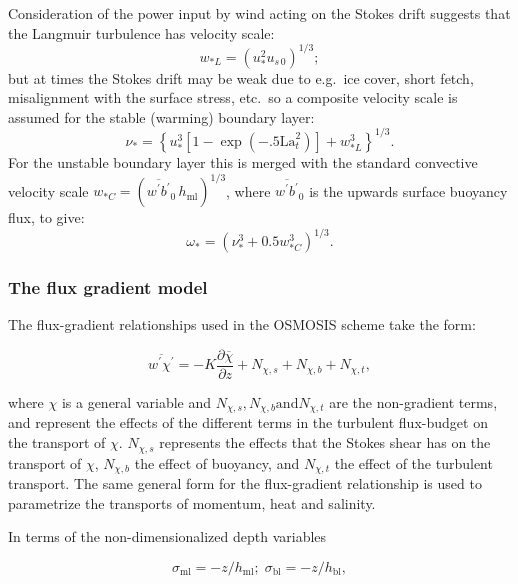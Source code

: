 \documentclass[../main/NEMO_manual]{subfiles}
\begin{document}
Consideration of the power input by wind acting on the Stokes drift suggests that the Langmuir turbulence has velocity scale:
\begin{equation}
  \label{eq:ZDF_w_La}
  w_{*L}= \left(u_*^2 u_{s\,0}\right)^{1/3};
\end{equation}
but at times the Stokes drift may be weak due to e.g.\ ice cover, short fetch, misalignment with the surface stress, etc.\ so  a composite velocity scale is assumed for the stable (warming) boundary layer:
\begin{equation}
  \label{eq:ZDF_composite-nu}
  \nu_{\ast}= \left\{ u_*^3 \left[1-\exp(-.5 \mathrm{La}_t^2)\right]+w_{*L}^3\right\}^{1/3}.
\end{equation}
For the unstable boundary layer this is merged with the standard convective velocity scale $w_{*C}=\left(\overline{w^\prime b^\prime}_0 \,h_\mathrm{ml}\right)^{1/3}$, where $\overline{w^\prime b^\prime}_0$ is the upwards surface buoyancy flux, to give:
\begin{equation}
  \label{eq:ZDF_vel-scale-unstable}
  \omega_* = \left(\nu_*^3 + 0.5 w_{*C}^3\right)^{1/3}.
\end{equation}

\subsubsection{The flux gradient model}
The flux-gradient relationships used in the OSMOSIS scheme take the form:

\begin{equation}
  \label{eq:ZDF_flux-grad-gen}
  \overline{w^\prime\chi^\prime}=-K\frac{\partial\overline{\chi}}{\partial z} + N_{\chi,s} +N_{\chi,b} +N_{\chi,t},
\end{equation}

where $\chi$ is a general variable and $N_{\chi,s}, N_{\chi,b} \mathrm{and} N_{\chi,t}$  are the non-gradient terms, and represent the effects of the different terms in the turbulent flux-budget on the transport of $\chi$. $N_{\chi,s}$ represents the effects that the Stokes shear has on the transport of $\chi$, $N_{\chi,b}$  the effect of buoyancy, and $N_{\chi,t}$ the effect of the turbulent transport.  The same general form for the flux-gradient relationship is used to parametrize the transports of momentum, heat and salinity.

In terms of the non-dimensionalized depth variables

\begin{equation}
  \label{eq:ZDF_sigma}
  \sigma_{\mathrm{ml}}= -z/h_{\mathrm{ml}}; \;\sigma_{\mathrm{bl}}= -z/h_{\mathrm{bl}},
\end{equation}
\end{document}
